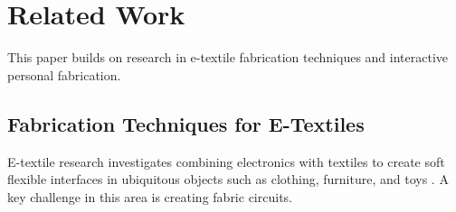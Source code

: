 \section{Related Work}
This paper builds on research in e-textile fabrication techniques and interactive personal fabrication.

\subsection{Fabrication Techniques for E-Textiles}
E-textile research investigates combining electronics with textiles to create soft flexible interfaces in ubiquitous objects such as clothing, furniture, and toys \cite{Buechley2009}. A key challenge in this area is creating fabric circuits.
% 
% 
% 
